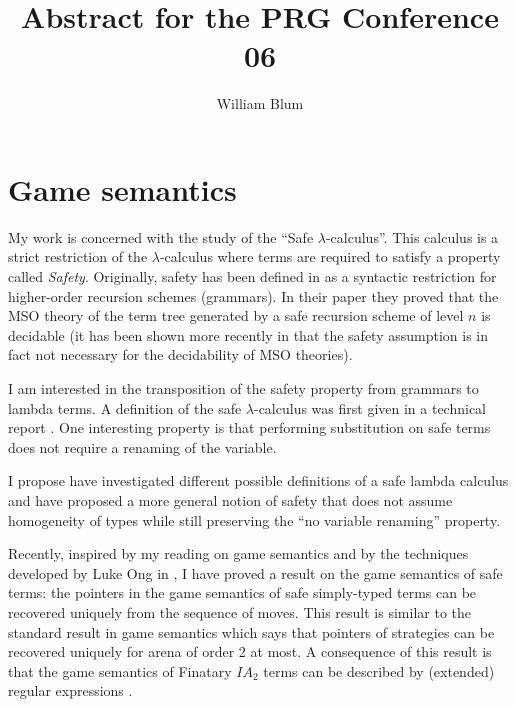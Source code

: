 \documentclass[12pt]{article}
\author{William Blum}
\title{Abstract for the PRG Conference 06}
\begin{document}
\maketitle

\section{Game semantics}

My work is concerned with the study of the ``Safe
$\lambda$-calculus''. This calculus is a strict restriction of the
$\lambda$-calculus where terms are required to satisfy a property
called \emph{Safety}. Originally, safety has been defined in
\cite{KNU02} as a syntactic restriction for higher-order recursion
schemes (grammars). In their paper they proved that the MSO theory
of the term tree generated by a safe recursion scheme of level $n$
is decidable (it has been shown more recently in \cite{OngLics2006}
that the safety assumption is in fact not necessary for the
decidability of MSO theories).

I am interested in the transposition of the safety property from
grammars to lambda terms. A definition of the safe
$\lambda$-calculus was first given in a technical report
\citep{safety-mirlong2004}. One interesting property is that
performing substitution on safe terms does not require a renaming of
the variable.

I propose have investigated different possible definitions of a safe
lambda calculus and have proposed a more general notion of safety
that does not assume homogeneity of types while still preserving the
``no variable renaming'' property.



Recently, inspired by my reading on game semantics
\citep{abramsky:game-semantics-tutorial} and by the techniques
developed by Luke Ong in \citep{OngLics2006}, I have proved a result
on the game semantics of safe terms: the pointers in the game
semantics of safe simply-typed terms can be recovered uniquely from
the sequence of moves. This result is similar to the standard result
in game semantics which says that pointers of strategies can be
recovered uniquely for arena of order 2 at most. A consequence of
this result is that the game semantics of Finatary $IA_2$ terms can
be described by (extended) regular expressions
\cite{ghicamccusker00}.




\end{document}

